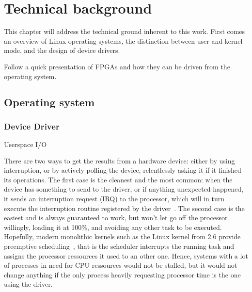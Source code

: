 \chapter{Technical background}\label{chap:theory}

This chapter will address the technical ground inherent to this work.
First comes an overview of Linux operating systems, the distinction between user and kernel mode, and the design of device drivers.

Follow a quick presentation of FPGAs and how they can be driven from the operating system.



\section{Operating system}



\subsection{Device Driver}\label{sec:theory-driver}
Userspace I/O~\cite{koch2011}

There are two ways to get the results from a hardware device: either by using interruption, or by actively polling the device, relentlessly asking it if it finished its operations.
The first case is the cleanest and the most common: when the device has something to send to the driver, or if anything unexpected happened, it sends an interruption request (IRQ) to the processor, which will in turn execute the interruption routine registered by the driver~\citep[chap. 10]{Corbet:2005:LDD:1209083}.
The second case is the easiest and is always guaranteed to work, but won't let go off the processor willingly, loading it at 100\%, and avoiding any other task to be executed.
Hopefully, modern monolithic kernels such as the Linux kernel from 2.6 provide preemptive scheduling~\cite{Santhanam2003}, that is the scheduler interrupts the running task and assigns the processor ressources it used to an other one.
Hence, systems with a lot of processes in need for CPU ressources would not be stalled, but it would not change anything if the only process heavily requesting processor time is the one using the driver.



